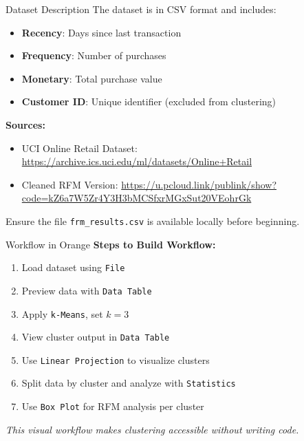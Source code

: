 \documentclass[aspectratio=169, table]{beamer}
\begin{document}
\begin{frame}{Dataset Description}
	\vspace{20pt}
	The dataset is in CSV format and includes:
	
	\begin{itemize}
		\item \textbf{Recency}: Days since last transaction
		\item \textbf{Frequency}: Number of purchases
		\item \textbf{Monetary}: Total purchase value
		\item \textbf{Customer ID}: Unique identifier (excluded from clustering)
	\end{itemize}
	
	\textbf{Sources:}
	\begin{itemize}
		\item UCI Online Retail Dataset: \url{https://archive.ics.uci.edu/ml/datasets/Online+Retail}
		\item Cleaned RFM Version: \url{https://u.pcloud.link/publink/show?code=kZ6a7W5Zr4Y3H3bMCSfxrMGxSut20VEohrGk}
	\end{itemize}
	
	Ensure the file \texttt{frm\_results.csv} is available locally before beginning.
\end{frame}

\begin{frame}{Workflow in Orange}
	\textbf{Steps to Build Workflow:}
	
	\begin{enumerate}
		\item Load dataset using \texttt{File}
		\item Preview data with \texttt{Data Table}
		\item Apply \texttt{k-Means}, set \(k = 3\)
		\item View cluster output in \texttt{Data Table}
		\item Use \texttt{Linear Projection} to visualize clusters
		\item Split data by cluster and analyze with \texttt{Statistics}
		\item Use \texttt{Box Plot} for RFM analysis per cluster
	\end{enumerate}
	
	\textit{This visual workflow makes clustering accessible without writing code.}
\end{frame}
\end{document}

